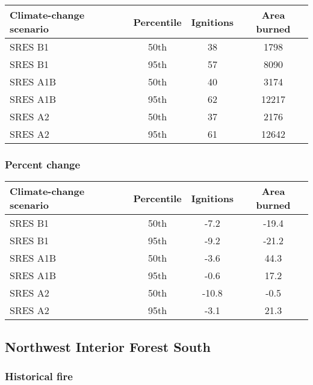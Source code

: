 \documentclass{article}\usepackage[]{graphicx}\usepackage[]{color}
\newcommand{\headcol}{\rowcolor{tableheadcolor}}
\begin{document}
\begin{table}[ht]
\centering
\begin{tabular}{lccc}
  \headcol 
 \toprule
Climate-change scenario & Percentile & Ignitions & Area burned \\ 
  \midrule
SRES B1 & 50th & 38 & 1798 \\ 
  SRES B1 & 95th & 57 & 8090 \\ 
  SRES A1B & 50th & 40 & 3174 \\ 
  SRES A1B & 95th & 62 & 12217 \\ 
  SRES A2 & 50th & 37 & 2176 \\ 
  SRES A2 & 95th & 61 & 12642 \\ 
   \bottomrule
\end{tabular}
\end{table}


\subsubsection{Percent change}

\begin{table}[ht]
\centering
\begin{tabular}{lccc}
  \headcol 
 \toprule
Climate-change scenario & Percentile & Ignitions & Area burned \\ 
  \midrule
SRES B1 & 50th & -7.2 & -19.4 \\ 
  SRES B1 & 95th & -9.2 & -21.2 \\ 
  SRES A1B & 50th & -3.6 & 44.3 \\ 
  SRES A1B & 95th & -0.6 & 17.2 \\ 
  SRES A2 & 50th & -10.8 & -0.5 \\ 
  SRES A2 & 95th & -3.1 & 21.3 \\ 
   \bottomrule
\end{tabular}
\end{table}


\newpage
\subsection{Northwest Interior Forest South}
\subsubsection{Historical fire}
\end{document}
